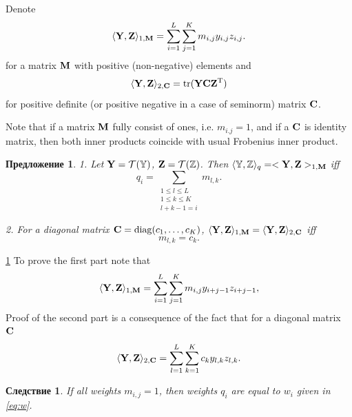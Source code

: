 \documentclass[12pt,a4paper,fleqn,leqno]{article}
\DeclareMathOperator{\tr}{tr}
\newtheorem{corollary}{Следствие}
\newtheorem{proposition}{Предложение}
\begin{document}
Denote
\begin{equation}
\label{eq:norm1M}
    \langle\mathbf{Y},\mathbf{Z}\rangle_{1,\mathbf{M}} = \sum_{i = 1}^L \sum_{j=1}^K m_{i,j} y_{i,j} z_{i,j}.
\end{equation}
for a matrix $\mathbf{M}$ with positive (non-negative) elements and
\begin{equation}
\label{eq:norm2S}
    \langle\bfY,\bfZ\rangle_{2,\bfC} = \tr(\bfY \bfC \bfZ^\rmT)
\end{equation}
for positive definite (or positive negative in a case of seminorm) matrix $\mathbf{C}$.

Note that if a matrix $\mathbf{M}$ fully consist of ones, i.e. $m_{i.j}=1$,
and if a $\mathbf{C}$ is identity matrix, then both inner products coincide with usual Frobenius inner product.

\begin{proposition}
\label{prop:equiv_tasks}
1. Let $\mathbf{Y} = \mathcal{T}(\mathbb{Y})$,  $\mathbf{Z} = \mathcal{T}(\mathbb{Z})$. Then $\langle\mathbb{Y},\mathbb{Z}\rangle_q= <\mathbf{Y},\mathbf{Z}>_{1,\mathbf{M}}$ iff
\begin{equation}\label{qi_mi}
q_i = \sum_{\substack{1 \le l \le L \\ 1 \le k \le K \\ l+k-1=i}} m_{l,k}.
\end{equation}

2. For a diagonal matrix $\mathbf{C}=\mathop{\mathrm{diag}}(c_1,\ldots,c_K)$, $\langle\mathbf{Y},\mathbf{Z}\rangle_{1,\mathbf{M}}= \langle\mathbf{Y},\mathbf{Z}\rangle_{2,\mathbf{C}}$ iff
\begin{equation}\label{sk_mlk}
m_{l,k}=c_k.
\end{equation}
\end{proposition}
\begin{proof5}{\ref{prop:equiv_tasks}}
To prove the first part note that
\begin{equation*}
\langle \mathbf{Y}, \mathbf{Z} \rangle_{1,\mathbf{M}} = \sum_{i = 1}^L \sum_{j = 1}^K m_{i,j} y_{i + j - 1} z_{i + j - 1},
\end{equation*}
Proof of the second part is a consequence of the fact that for a diagonal matrix $\mathbf{C}$
\begin{equation*}
\langle \mathbf{Y}, \mathbf{Z} \rangle_{2,\mathbf{C}} = \sum_{l=1}^L \sum_{k=1}^K c_k y_{l,k} z_{l, k}.
\end{equation*}
\end{proof5}

\begin{corollary}
\label{cor:base_weights}
If all weights $m_{i,j}=1$, then weights $q_i$ are equal to $w_i$ given in \eqref{eq:w}.
\end{corollary}
\end{document}
